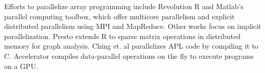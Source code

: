Efforts to parallelize array programming include
Revolution R \cite{rro} and Matlab's parallel computing toolbox, which
offer multicore parallelism and explicit distributed parallelism using MPI and MapReduce. 
Other works focus on implicit parallelization.
Presto \cite{presto} extends R to sparse matrix operations in distributed memory for graph
analysis. Ching et. al \cite{Ching12} parallelizes APL code by
compiling it to C. Accelerator \cite{accelerator} compiles
data-parallel operations on the fly to execute programs on a GPU.
